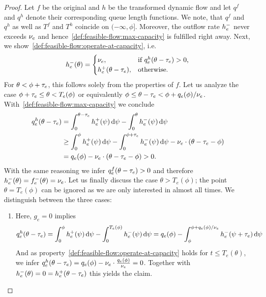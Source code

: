 \begin{proof}
    Let $f$ be the original and $h$ be the transformed dynamic flow and let $q^f$ and $q^h$ denote their corresponding queue length functions.
    We note, that $q^f$ and $q^h$ as well as $T^f$ and $T^h$ coincide on $(-\infty, \phi]$.
    Moreover, the outflow rate $\outfl[h]_e$ never exceeds $\capa_e$ and hence~\ref{def:feasible-flow:max-capacity} is fulfilled right away.
    Next, we show~\ref{def:feasible-flow:operate-at-capacity}, i.e. \[
        \outfl[h]_e(\theta) = \begin{cases}
            \capa_e, &\text{if $q^h_e(\theta - \transit_e) > 0$,} \\
            \infl[h]_e(\theta - \transit_e), &\text{otherwise.}
        \end{cases}
    \]
    For $\theta < \phi + \transit_e$, this follows solely from the properties of $f$.
    Let us analyze the case $\phi + \transit_e \leq \theta < T_e(\phi)$ or equivalently $\phi  \leq \theta - \transit_e < \phi + q_e(\phi) /\capa_e$.
    With~\ref{def:feasible-flow:max-capacity} we conclude \begin{align*}
        q_e^h(\theta - \transit_e)
        &= \int_0^{\theta-\transit_e} \infl[h]_e(\psi) \diff \psi - \int_0^{\theta} \outfl[h]_e(\psi) \diff \psi \\
        &\geq \int_0^{\phi} \infl[h]_e(\psi)\diff \psi - \int_0^{\phi + \transit_e} \outfl[h]_e(\psi) \diff \psi
        - \capa_e\cdot (\theta - \transit_e - \phi)\\
        & = q_e(\phi) - \capa_e\cdot(\theta - \transit_e - \phi) >  0.
    \end{align*}
    With the same reasoning we infer $q_e^f(\theta - \transit_e) > 0$ and therefore $\outfl[h]_e(\theta) = \outfl[f]_e(\theta) = \capa_e$.
    Let us finally discuss the case $\theta > T_e(\phi)$;
    the point $\theta = T_e(\phi)$ can be ignored as we are only interested in almost all times.
    We distinguish between the three cases:
    \begin{enumerate}[label=\textbf{Case \Roman*.}, wide=0.5em]
        \item Here, $g_e = 0$ implies \begin{align*}
            q_e^h(\theta - \transit_e)
            = \int_0^\phi \infl[h]_e(\psi) \diff \psi - \int_0^{T_e(\phi)} \outfl[h]_e(\psi)\diff \psi
            = q_e(\phi) - \int_\phi^{\phi + q_e(\phi)/\capa_e} \outfl[h]_e(\psi + \transit_e)\diff \psi
        \end{align*}
        And as property~\ref{def:feasible-flow:operate-at-capacity} holds for $t\leq T_e(\theta)$, we infer $q_e^h(\theta - \transit_e) = q_e(\phi) - \capa_e \cdot \frac{q_e(\phi)}{\capa_e} = 0$.
        Together with $\outfl[h]_e(\theta) = 0 = \infl[h]_e(\theta - \transit_e)$ this yields the claim.


\end{enumerate}
\end{proof}
